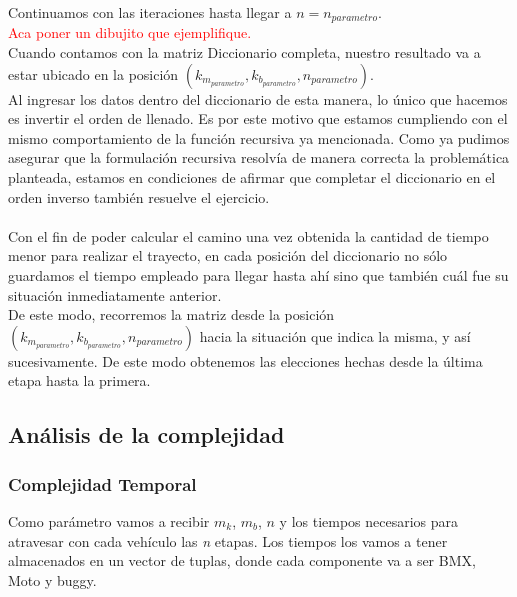Continuamos con las iteraciones hasta llegar a $n=n_{parametro}$.\\

\textcolor{red}{Aca poner un dibujito que ejemplifique.}\\

Cuando contamos con la matriz Diccionario completa, nuestro resultado va a estar ubicado en la posici\'on $(k_{m_{parametro}},k_{b_{parametro}},n_{parametro})$.\\

Al ingresar los datos dentro del diccionario de esta manera, lo \'unico que hacemos es invertir el orden de llenado. Es por este motivo que estamos cumpliendo con el mismo comportamiento de la funci\'on recursiva ya mencionada. Como ya pudimos asegurar que la formulaci\'on recursiva resolv\'ia de manera correcta la problem\'atica planteada, estamos en condiciones de afirmar que completar el diccionario en el orden inverso tambi\'en resuelve el ejercicio.\\
\\


Con el fin de poder calcular el camino una vez obtenida la cantidad de tiempo menor para realizar el trayecto, en cada posici\'on del diccionario no s\'olo guardamos el tiempo empleado para llegar hasta ah\'i sino que tambi\'en cu\'al fue su situaci\'on inmediatamente anterior.\\

De este modo, recorremos la matriz  desde la posici\'on $(k_{m_{parametro}},k_{b_{parametro}},n_{parametro})$ hacia la situaci\'on que indica la misma, y as\'i sucesivamente. De este modo obtenemos las elecciones hechas desde la \'ultima etapa hasta la primera.



\newpage
\subsection{An\'alisis de la complejidad}
\subsubsection{Complejidad Temporal}

Como par\'ametro vamos a recibir $m_k$, $m_b$, $n$ y los tiempos necesarios para atravesar con cada veh\'iculo las \emph{n} etapas. Los tiempos los vamos a tener almacenados en un vector de tuplas, donde cada componente va a ser BMX, Moto y buggy.\\

